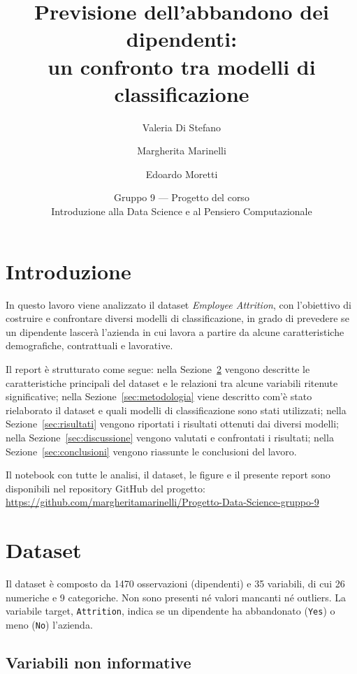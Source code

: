 \documentclass[11pt,a4paper]{article}
\title{Previsione dell'abbandono dei dipendenti:\\ un confronto tra modelli di classificazione}
\author{Valeria Di Stefano \and Margherita Marinelli \and Edoardo Moretti}
\date{Gruppo 9 --- Progetto del corso\\ Introduzione alla Data Science e al Pensiero Computazionale}
\begin{document}
\maketitle
\tableofcontents
\newpage


\section{Introduzione}

In questo lavoro viene analizzato il dataset \emph{Employee Attrition}, con l'obiettivo di costruire e confrontare diversi modelli di classificazione, in grado di prevedere se un dipendente lascer\`{a} l'azienda in cui lavora a partire da alcune caratteristiche demografiche, contrattuali e lavorative.

Il report \`{e} strutturato come segue: nella Sezione~\ref{sec:dataset} vengono descritte le caratteristiche principali del dataset e le relazioni tra alcune variabili ritenute significative; nella Sezione~\ref{sec:metodologia} viene descritto com'\`{e} stato rielaborato il dataset e quali modelli di classificazione sono stati utilizzati; nella Sezione~\ref{sec:risultati} vengono riportati i risultati ottenuti dai diversi modelli; nella Sezione~\ref{sec:discussione} vengono valutati e confrontati i risultati; nella Sezione~\ref{sec:conclusioni} vengono riassunte le conclusioni del lavoro.

Il notebook con tutte le analisi, il dataset, le figure e il presente report sono disponibili nel repository GitHub del progetto: 
\\
\url{https://github.com/margheritamarinelli/Progetto-Data-Science-gruppo-9} %


\section{Dataset}
\label{sec:dataset}

Il dataset \`{e} composto da 1470 osservazioni (dipendenti) e 35 variabili, di cui 26 numeriche e 9 categoriche. Non sono presenti n\'{e} valori mancanti n\'{e} outliers. La variabile target, \texttt{Attrition}, indica se un dipendente ha abbandonato (\texttt{Yes}) o meno (\texttt{No}) l'azienda.

\subsection{Variabili non informative}
\label{sec:non-informative}
\end{document}
